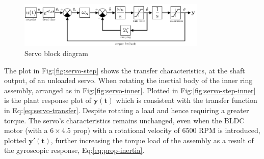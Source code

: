 \begin{figure}[hbtp]
\centering
\includegraphics[width=0.8\textwidth]{figs/servo-block}
\vspace{-5pt}
\caption{Servo block diagram}
\label{fig:servo-block}
\vspace{-15pt}
\end{figure}
\par
The plot in Fig:\ref{fig:servo-step} shows the transfer characteristics, at the shaft output, of an unloaded servo. When rotating the inertial body of the inner ring assembly, arranged as in Fig:\ref{fig:servo-inner}. Plotted in Fig:\ref{fig:servo-step-inner} is the plant response plot of {\color{Blue}$\mathbf{y(t)}$} which is consistent with the transfer function in Eq:\ref{eq:servo-transfer}. Despite rotating a load and hence requiring a greater torque. The servo's characteristics remains unchanged, even when the BLDC motor (with a $6\times4.5$ prop) with a rotational velocity of 6500 RPM is introduced, plotted {\color{Red}$\mathbf{y'(t)}$}, further increasing the torque load of the assembly as a result of the gyroscopic response, Eq:\ref{eq:prop-inertia}.
